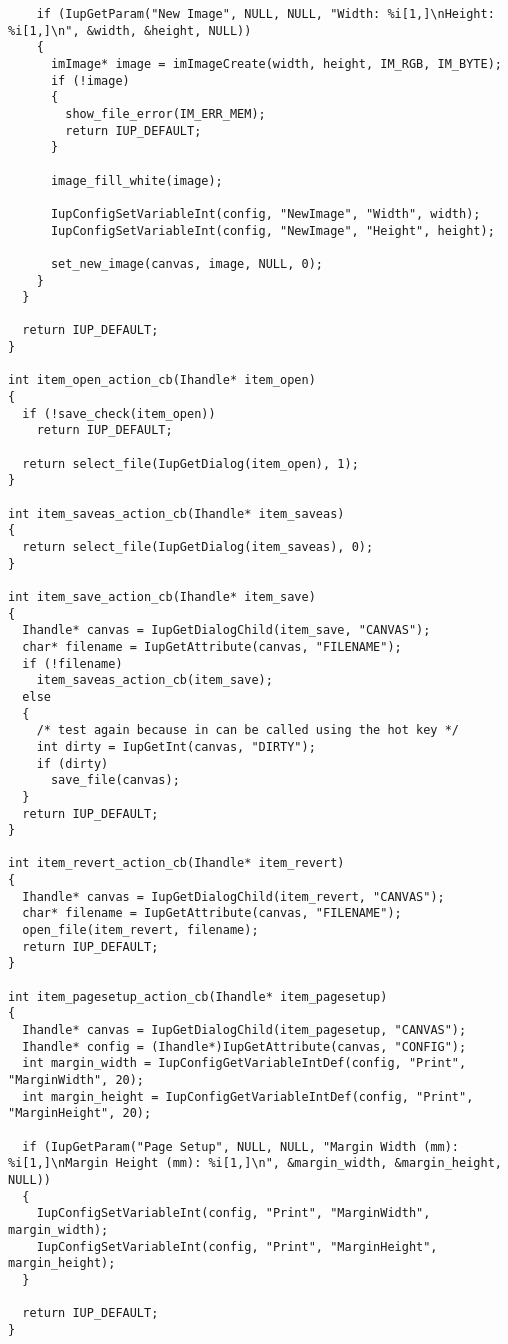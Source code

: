 \documentclass{ctexart}
\begin{document}
\begin{lstlisting}
    if (IupGetParam("New Image", NULL, NULL, "Width: %i[1,]\nHeight: %i[1,]\n", &width, &height, NULL))
    {
      imImage* image = imImageCreate(width, height, IM_RGB, IM_BYTE);
      if (!image)
      {
        show_file_error(IM_ERR_MEM);
        return IUP_DEFAULT;
      }

      image_fill_white(image);

      IupConfigSetVariableInt(config, "NewImage", "Width", width);
      IupConfigSetVariableInt(config, "NewImage", "Height", height);

      set_new_image(canvas, image, NULL, 0);
    }
  }

  return IUP_DEFAULT;
}

int item_open_action_cb(Ihandle* item_open)
{
  if (!save_check(item_open))
    return IUP_DEFAULT;

  return select_file(IupGetDialog(item_open), 1);
}

int item_saveas_action_cb(Ihandle* item_saveas)
{
  return select_file(IupGetDialog(item_saveas), 0);
}

int item_save_action_cb(Ihandle* item_save)
{
  Ihandle* canvas = IupGetDialogChild(item_save, "CANVAS");
  char* filename = IupGetAttribute(canvas, "FILENAME");
  if (!filename)
    item_saveas_action_cb(item_save);
  else   
  {
    /* test again because in can be called using the hot key */
    int dirty = IupGetInt(canvas, "DIRTY");
    if (dirty)
      save_file(canvas);
  }
  return IUP_DEFAULT;
}

int item_revert_action_cb(Ihandle* item_revert)
{
  Ihandle* canvas = IupGetDialogChild(item_revert, "CANVAS");
  char* filename = IupGetAttribute(canvas, "FILENAME");
  open_file(item_revert, filename);
  return IUP_DEFAULT;
}

int item_pagesetup_action_cb(Ihandle* item_pagesetup)
{
  Ihandle* canvas = IupGetDialogChild(item_pagesetup, "CANVAS");
  Ihandle* config = (Ihandle*)IupGetAttribute(canvas, "CONFIG");
  int margin_width = IupConfigGetVariableIntDef(config, "Print", "MarginWidth", 20);
  int margin_height = IupConfigGetVariableIntDef(config, "Print", "MarginHeight", 20);

  if (IupGetParam("Page Setup", NULL, NULL, "Margin Width (mm): %i[1,]\nMargin Height (mm): %i[1,]\n", &margin_width, &margin_height, NULL))
  {
    IupConfigSetVariableInt(config, "Print", "MarginWidth", margin_width);
    IupConfigSetVariableInt(config, "Print", "MarginHeight", margin_height);
  }

  return IUP_DEFAULT;
}


\end{lstlisting}
\end{document}
